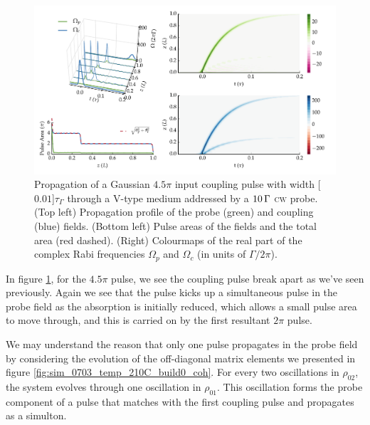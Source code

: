     \begin{figure}[h]
    \centering
    \includegraphics[width=\linewidth]
      {figs/06_simultons/mb_vee_sit_plot_45pi_Ng1e4_fig1.pdf}
    \caption{
    Propagation of a Gaussian $4.5 \pi$ input coupling pulse with width
    \unit[$0.01$]{$\tau_\Gamma$} through a V-type medium addressed by a
    $\unit[10]{\Gamma}$ \textsc{cw} probe. (Top left) Propagation profile of the
    probe (green) and coupling (blue) fields. (Bottom left) Pulse areas of the
    fields and the total area (red dashed). (Right) Colourmaps of the real part
    of the complex Rabi frequencies $\Omega_{p}$ and $\Omega_{c}$ (in units of
    $\Gamma/2\pi$).
    }
    \label{fig:pulse_cw_4pi_cmap}
    \end{figure}

    In figure \ref{fig:pulse_cw_4pi_cmap}, for the $4.5 \pi$ pulse, we see the
    coupling pulse break apart as we've seen previously. Again we see that the
    pulse kicks up a simultaneous pulse in the probe field as the absorption is
    initially reduced, which allows a small pulse area to move through, and this
    is carried on by the first resultant $2 \pi$ pulse.

    We may understand the reason that only one pulse propagates in the probe
    field by considering the evolution of the off-diagonal matrix elements we
    presented in figure \ref{fig:sim_0703_temp_210C_build0_coh}. For every two
    oscillations in $\rho_{02}$, the system evolves through one oscillation in
    $\rho_{01}$. This oscillation forms the probe component of a pulse that
    matches with the first coupling pulse and propagates as a simulton.

